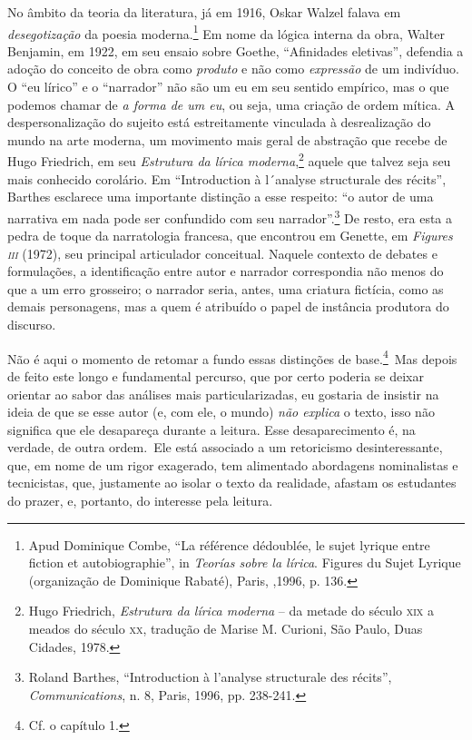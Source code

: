 No âmbito da teoria da literatura, já em 1916, Oskar Walzel falava em
\emph{desegotização} da poesia moderna.\footnote{Apud Dominique Combe,
  ``La référence dédoublée, le sujet lyrique entre fiction et
  autobiographie'', in \emph{Teorías sobre la lírica}. Figures du Sujet
  Lyrique (organização de Dominique Rabaté), Paris, ,1996, p. 136.}
Em nome da lógica interna da obra, Walter Benjamin, em 1922, em seu
ensaio sobre Goethe, ``Afinidades eletivas'', defendia a adoção do
conceito de obra como \emph{produto} e não como \emph{expressão} de um
indivíduo. O ``eu lírico'' e o ``narrador'' não são um eu em seu sentido
empírico, mas o que podemos chamar de \emph{a forma de um eu}, ou seja,
uma criação de ordem mítica. A despersonalização do sujeito está
estreitamente vinculada à desrealização do mundo na arte moderna, um
movimento mais geral de abstração que recebe de Hugo Friedrich, em seu
\emph{Estrutura da lírica moderna},\footnote{Hugo Friedrich,
  \emph{Estrutura da lírica moderna} -- da metade do século \textsc{xix}
  a meados do século \textsc{xx}, tradução de Marise M. Curioni, São
  Paulo, Duas Cidades, 1978.} aquele que talvez seja seu mais conhecido
corolário. Em ``Introduction à l´analyse structurale des récits'',
Barthes esclarece uma importante distinção a esse respeito: ``o autor de
uma narrativa em nada pode ser confundido com seu narrador''.\footnote{Roland
  Barthes, ``Introduction à l'analyse structurale des récits'',
  \emph{Communications}, n. 8, Paris, 1996, pp. 238-241.} De resto, era
esta a pedra de toque da narratologia francesa, que encontrou em
Genette, em \emph{Figures \textsc{iii}} (1972), seu principal
articulador conceitual. Naquele contexto de debates e formulações, a
identificação entre autor e narrador correspondia não menos do que a um
erro grosseiro; o narrador seria, antes, uma criatura fictícia, como as
demais personagens, mas a quem é atribuído o papel de instância
produtora do discurso.

Não é aqui o momento de retomar a fundo essas distinções de
base.\footnote{Cf. o capítulo 1.}~Mas depois de feito este longo e
fundamental percurso, que por certo poderia se deixar orientar ao sabor
das análises mais particularizadas, eu gostaria de insistir na ideia de
que se esse autor (e, com ele, o mundo) \emph{não explica} o texto, isso
não significa que ele desapareça durante a leitura. Esse desaparecimento
é, na verdade, de outra ordem.~Ele está associado a um retoricismo
desinteressante, que, em nome de um rigor exagerado, tem alimentado
abordagens nominalistas e tecnicistas, que, justamente ao isolar o texto
da realidade, afastam os estudantes do prazer, e, portanto, do interesse
pela leitura.

